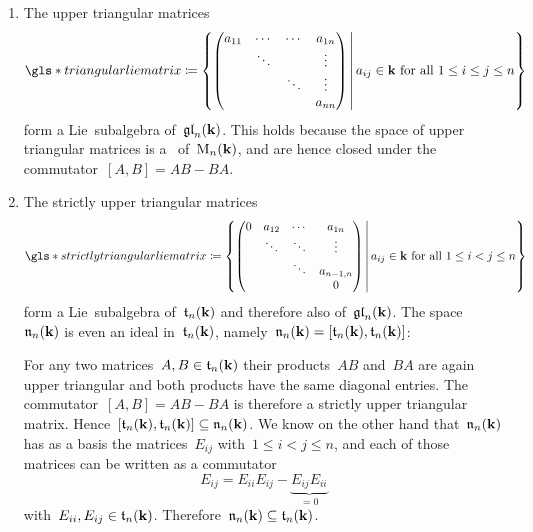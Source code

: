 \begin{examples}
\begin{enumerate}
    \item
      The upper triangular matrices
      \[
        \gls*{triangular lie matrix}
        \defined
        \left\{
          \begin{pmatrix}
              a_{11}
            & \cdots
            & \cdots
            & a_{1n}
            \\
              {}
            & \ddots
            & {}
            & \vdots
            \\
              {}
            & {}
            & \ddots
            & \vdots
            \\
              {}
            & {}
            & {}
            & a_{nn}
          \end{pmatrix}
        \suchthat*
          \text{$a_{ij} \in \kf$ for all~$1 \leq i \leq j \leq n$}
        \right\}
      \]
      form a Lie~subalgebra of~$\mathfrak{gl}_n(\mathbf{k})$.
      This holds because the space of upper triangular matrices is a~{\subalgebra{$\kf$}} of~$\operatorname{M}_n(\mathbf{k})$, and are hence closed under the commutator~$[A,B] = AB - BA$.
   
    \item
      The strictly upper triangular matrices
      \[
        \gls*{strictly triangular lie matrix}
        \defined
        \left\{
          \begin{pmatrix}
              0
            & a_{12}
            & \cdots
            & a_{1n}
            \\
              {}
            & \ddots
            & \ddots
            & \vdots
            \\
              {}
            & {}
            & \ddots
            & a_{n-1,n}
            \\
              {}
            & {}
            & {}
            & 0
          \end{pmatrix}
        \suchthat*
          \text{$a_{ij} \in \kf$ for all~$1 \leq i < j \leq n$}
        \right\}
      \]
      form a Lie~subalgebra of~$\mathfrak{t}_n(\mathbf{k})$ and therefore also of~$\mathfrak{gl}_n(\mathbf{k})$.
      The space~$\mathfrak{n}_n(\mathbf{k})$ is even an ideal in~$\mathfrak{t}_n(\mathbf{k})$, namely~$\mathfrak{n}_n(\mathbf{k}) = [\mathfrak{t}_n(\mathbf{k}), \mathfrak{t}_n(\mathbf{k})]$:
    
      For any two matrices~$A, B \in \mathfrak{t}_n(\mathbf{k})$ their products~$AB$ and~$BA$ are again upper triangular and both products have the same diagonal entries.
      The commutator~$[A,B] = AB - BA$ is therefore a strictly upper triangular matrix.
      Hence~$[\mathfrak{t}_n(\mathbf{k}), \mathfrak{t}_n(\mathbf{k})] \subseteq \mathfrak{n}_n(\mathbf{k})$.
      We know on the other hand that~$\mathfrak{n}_n(\mathbf{k})$ has as a basis the matrices~$E_{ij}$ with~$1 \leq i < j \leq n$, and each of those matrices can be written as a commutator
      \[
        E_{ij}
        =
        E_{ii} E_{ij} - \underbrace{ E_{ij} E_{ii} }_{= 0}
      \]
      with~$E_{ii}, E_{ij} \in \mathfrak{t}_n(\mathbf{k})$.
      Therefore~$\mathfrak{n}_n(\mathbf{k}) \subseteq \mathfrak{t}_n(\mathbf{k})$.
      

\end{enumerate}
\end{examples}
